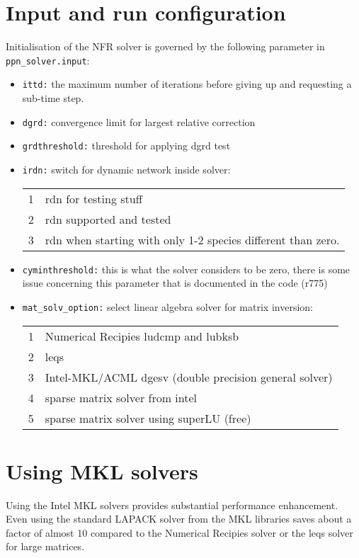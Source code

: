 \section{Input and run configuration}
 Initialisation of the NFR solver is governed by
the following parameter in \texttt{ppn\_solver.input}:
\begin{itemize}
\item {} \texttt{ittd:} the maximum number of iterations before giving up and requesting a sub-time step. 
\item {} \texttt{dgrd:} convergence limit for largest relative correction
\item {} \texttt{grdthreshold:} threshold for applying dgrd test
\item {} \texttt{irdn:} switch for dynamic network inside solver: \\
\begin{tabularx}{0.9\textwidth}{lX}
  1 & rdn for testing stuff \\
  2 & rdn supported and tested \\
  3 & rdn when starting with only 1-2 species different than zero. \\
\end{tabularx}
\item {} \texttt{cyminthreshold:} this is what the solver considers to be zero, there is some issue concerning this parameter that is documented in the code (r775)
\item {} \texttt{mat\_solv\_option:} select linear algebra solver for matrix inversion:
\\
\begin{tabularx}{0.9\textwidth}{lX}
  1 & Numerical Recipies ludcmp and lubksb \\
  2 & leqs \\
  3 & Intel-MKL/ACML dgesv (double precision general solver)  \\
  4 & sparse matrix solver from intel \\
  5 & sparse matrix solver using superLU (free) \\ 
\end{tabularx}
\end{itemize}

\section{Using MKL solvers}
Using the Intel MKL solvers provides substantial performance
enhancement. Even using the standard LAPACK solver from the MKL
libraries saves about a factor of almost 10 compared to the Numerical
Recipies solver or the leqs solver for large matrices. 

